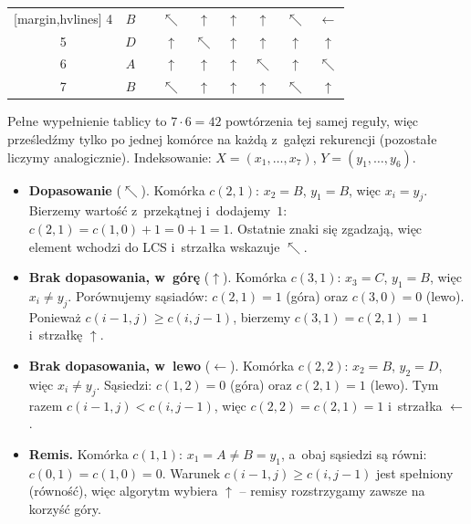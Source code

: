 \begin{table}[H]
\begin{minipage}{0.48\linewidth}
\begin{NiceTabular}{cc|c|cccccc}[margin,hvlines]
			4   & $B$   &       & $\nwarrow$ & $\uparrow$   & $\uparrow$   & $\uparrow$   & $\nwarrow$   & $\leftarrow$ \\
			5   & $D$   &       & $\uparrow$ & $\nwarrow$   & $\uparrow$   & $\uparrow$   & $\uparrow$   & $\uparrow$   \\
			6   & $A$   &       & $\uparrow$ & $\uparrow$   & $\uparrow$   & $\nwarrow$   & $\uparrow$   & $\nwarrow$   \\
			7   & $B$   &       & $\nwarrow$ & $\uparrow$   & $\uparrow$   & $\uparrow$   & $\nwarrow$   & $\uparrow$   \\
		\end{NiceTabular}
	\end{minipage}
\end{table}

\begin{dygresja}
	Pełne wypełnienie tablicy to $7 \cdot 6 = 42$ powtórzenia tej samej reguły, więc
	prześledźmy tylko po jednej komórce na każdą z~gałęzi rekurencji (pozostałe
	liczymy analogicznie). Indeksowanie: $X = (x_1, \dots, x_7)$, $Y = (y_1, \dots, y_6)$.

	\begin{itemize}
		\item \textbf{Dopasowanie} ($\nwarrow$). Komórka $c(2, 1)$: $x_2 = B$, $y_1 = B$,
		      więc $x_i = y_j$. Bierzemy wartość z~przekątnej i~dodajemy~$1$:
		      $c(2, 1) = c(1, 0) + 1 = 0 + 1 = 1$. Ostatnie znaki się zgadzają,
		      więc element wchodzi do LCS i~strzałka wskazuje $\nwarrow$.

		\item \textbf{Brak dopasowania, w~górę} ($\uparrow$). Komórka $c(3, 1)$: $x_3 = C$,
		      $y_1 = B$, więc $x_i \neq y_j$. Porównujemy sąsiadów:
		      $c(2, 1) = 1$ (góra) oraz $c(3, 0) = 0$ (lewo). Ponieważ
		      $c(i - 1, j) \geq c(i, j - 1)$, bierzemy $c(3, 1) = c(2, 1) = 1$ i~strzałkę $\uparrow$.

		\item \textbf{Brak dopasowania, w~lewo} ($\leftarrow$). Komórka $c(2, 2)$: $x_2 = B$,
		      $y_2 = D$, więc $x_i \neq y_j$. Sąsiedzi: $c(1, 2) = 0$ (góra) oraz
		      $c(2, 1) = 1$ (lewo). Tym razem $c(i - 1, j) < c(i, j - 1)$, więc
		      $c(2, 2) = c(2, 1) = 1$ i~strzałka $\leftarrow$.

		\item \textbf{Remis.} Komórka $c(1, 1)$: $x_1 = A \neq B = y_1$, a~obaj sąsiedzi
		      są równi: $c(0, 1) = c(1, 0) = 0$. Warunek $c(i - 1, j) \geq c(i, j - 1)$
		      jest spełniony (równość), więc algorytm wybiera $\uparrow$ -- remisy
		      rozstrzygamy zawsze na korzyść góry.
	\end{itemize}
\end{dygresja}


